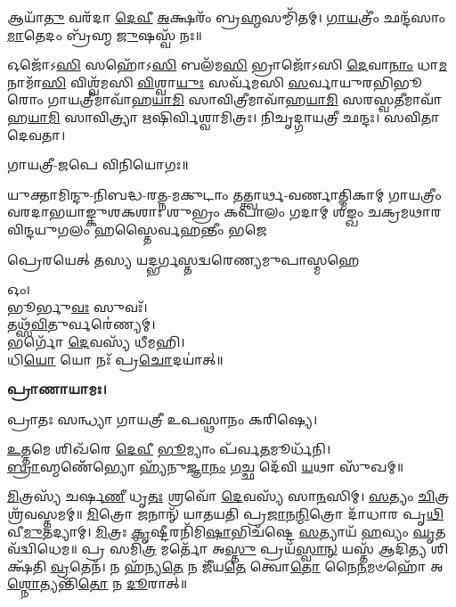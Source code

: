 𑌆𑌯𑌾᳴\-\ul{𑌤𑍁} 𑌵𑌰᳴𑌦𑌾 \ul{𑌦𑍇}\-\-\ul{𑌵𑍀} \ul{𑌅}\-𑌕𑍍𑌷𑌰𑌂᳴ 𑌬𑍍𑌰\-\ul{𑌹𑍍𑌮}\-𑌸𑌮𑍍𑌮𑌿᳴𑌤𑌮𑍍। \ul{𑌗𑌾}\-\-\ul{𑌯}\-𑌤𑍍𑌰𑍀𑌂॑ 𑌛𑌨𑍍𑌦᳴𑌸𑌾𑌂 \ul{𑌮𑌾}\-𑌤𑍇𑌦𑌂 𑌬𑍍𑌰᳴𑌹𑍍𑌮 \ul{𑌜𑍁}\-𑌷𑌸𑍍𑌵᳴ 𑌨𑌃॥

𑌓𑌜𑍋᳴𑌽\-\ul{𑌸𑌿} 𑌸𑌹𑍋᳴𑌽\-\ul{𑌸𑌿} 𑌬𑌲᳴𑌮\-\ul{𑌸𑌿} 𑌭𑍍𑌰𑌾𑌜𑍋᳴𑌽𑌸𑌿 \ul{𑌦𑍇}\-𑌵𑌾\-\ul{𑌨𑌾𑌂} 𑌧𑌾\-\ul{𑌮} 𑌨𑌾𑌮𑌾᳴\-\ul{𑌸𑌿} 𑌵𑌿𑌶𑍍𑌵᳴𑌮𑌸𑌿 \ul{𑌵𑌿}\-𑌶𑍍𑌵𑌾\-\ul{𑌯𑍁𑌃} 𑌸𑌰𑍍𑌵᳴𑌮𑌸𑌿 \ul{𑌸}\-𑌰𑍍𑌵𑌾𑌯𑍁𑌰𑌭𑌿𑌭𑍂𑌰𑍋𑌂 𑌗𑌾𑌯𑌤𑍍𑌰𑍀𑌮𑌾𑌵𑌾᳴𑌹\-\ul{𑌯𑌾}\-\-\ul{𑌮𑌿} 𑌸𑌾𑌵𑌿𑌤𑍍𑌰𑍀𑌮𑌾𑌵𑌾᳴𑌹\-\ul{𑌯𑌾}\-\-\ul{𑌮𑌿} 𑌸𑌰𑌸𑍍𑌵𑌤𑍀𑌮𑌾𑌵𑌾᳴𑌹\-\-\ul{𑌯𑌾}\-\-\ul{𑌮𑌿} 𑌸𑌾𑌵𑌿𑌤𑍍𑌰𑍍𑌯𑌾 𑌋𑌷𑌿𑌰𑍍𑌵𑌿𑌶𑍍𑌵𑌾𑌮𑌿𑌤𑍍𑌰𑌃। 𑌨𑌿𑌚𑍃𑌦𑍍𑌗𑌾𑌯𑌤𑍍𑌰𑍀 𑌛𑌨𑍍𑌦𑌃। 𑌸𑌵𑌿𑌤𑌾 𑌦𑍇𑌵𑌤𑌾।

𑌗𑌾𑌯𑌤𑍍𑌰𑍀-𑌜𑌪𑍇 𑌵𑌿𑌨𑌿𑌯𑍋𑌗𑌃॥



{𑌯𑍁𑌕𑍍𑌤𑌾𑌮𑌿𑌨𑍍𑌦𑍁-𑌨𑌿𑌬𑌦𑍍𑌧-𑌰𑌤𑍍𑌨-𑌮𑌕𑍁𑌟𑌾𑌂 𑌤𑌤𑍍𑌤𑍍𑌵𑌾𑌰𑍍𑌥-𑌵𑌰𑍍𑌣𑌾𑌤𑍍𑌮𑌿𑌕𑌾𑌮𑍍}
{𑌗𑌾𑌯𑌤𑍍𑌰𑍀𑌂 𑌵𑌰𑌦𑌾𑌭𑌯𑌾𑌙𑍍𑌕𑍁𑌶𑌕𑌶𑌾𑌃 𑌶𑍁𑌭𑍍𑌰𑌂 𑌕𑌪𑌾𑌲𑌂 𑌗𑌦𑌾𑌮𑍍}
{𑌶𑌙𑍍𑌖𑌂 𑌚𑌕𑍍𑌰𑌮𑌥𑌾𑌰𑌵𑌿𑌨𑍍𑌦𑌯𑍁𑌗𑌲𑌂 𑌹𑌸𑍍𑌤𑍈𑌰𑍍𑌵𑌹𑌨𑍍𑌤𑍀𑌂 𑌭𑌜𑍇}

{𑌪𑍍𑌰𑍇𑌰𑌯𑍇𑌤𑍍 𑌤𑌸𑍍𑌯 𑌯𑌦𑍍𑌭𑌰𑍍𑌗𑌸𑍍𑌤𑌦𑍍𑌵𑌰𑍇𑌣𑍍𑌯𑌮𑍁𑌪𑌾𑌸𑍍𑌮𑌹𑍇}


𑌓𑌂।\\
𑌭𑍂𑌰𑍍𑌭𑍁\-\ul{𑌵𑌃} 𑌸𑍁𑌵𑌃᳴।\\
𑌤𑌥𑍍𑌸᳴\-\ul{𑌵𑌿}\-𑌤𑍁𑌰𑍍𑌵𑌰𑍇॑𑌣𑍍𑌯𑌮𑍍।\\
𑌭𑌰𑍍𑌗𑍋᳴ \ul{𑌦𑍇}\-𑌵𑌸𑍍𑌯᳴ 𑌧𑍀𑌮𑌹𑌿।\\
𑌧𑌿\-\ul{𑌯𑍋} 𑌯𑍋 𑌨𑌃᳴ 𑌪𑍍𑌰\-\ul{𑌚𑍋}\-𑌦𑌯𑌾॑𑌤𑍍॥

\textbf{𑌪𑍍𑌰𑌾𑌣𑌾𑌯𑌾𑌮𑌃।}


𑌪𑍍𑌰𑌾𑌤𑌃 𑌸𑌨𑍍𑌧𑍍𑌯𑌾 𑌗𑌾𑌯𑌤𑍍𑌰𑍀 𑌉𑌪𑌸𑍍𑌥𑌾𑌨𑌂 𑌕𑌰𑌿𑌷𑍍𑌯𑍇।

\-\ul{𑌉}\-𑌤𑍍𑌤𑌮𑍇 𑌶𑌿𑌖᳴𑌰𑍇 \ul{𑌦𑍇}\-\-\ul{𑌵𑍀} \ul{𑌭𑍂}\-𑌮𑍍𑌯𑌾𑌂 𑌪᳴𑌰𑍍𑌵\-\ul{𑌤}\-𑌮𑍂𑌰𑍍𑌧᳴𑌨𑌿।\\
\-\ul{𑌬𑍍𑌰𑌾}\-𑌹𑍍𑌮𑌣𑍇᳴᳴𑌭𑍍𑌯𑍋 𑌹𑍍𑌯᳴𑌨𑍁\-\ul{𑌜𑍍𑌞𑌾}\-\-\ul{𑌨𑌂} \ul{𑌗}\-𑌚𑍍𑌛 𑌦𑍇᳴𑌵𑌿 \ul{𑌯}\-𑌥𑌾 𑌸𑍁᳴𑌖𑌮𑍍॥


\-\ul{𑌮𑌿}\-𑌤𑍍𑌰𑌸𑍍𑌯᳴ 𑌚𑌰𑍍\mbox{}𑌷\-\ul{𑌣𑍀} 𑌧𑍃\-\ul{𑌤𑌃} 𑌶𑍍𑌰𑌵𑍋᳴ \ul{𑌦𑍇}\-𑌵𑌸𑍍𑌯᳴ 𑌸𑌾\-\ul{𑌨}\-𑌸𑌿𑌮𑍍। \ul{𑌸}\-𑌤𑍍𑌯𑌂 \ul{𑌚𑌿}\-𑌤𑍍𑌰𑌶𑍍𑌰᳴𑌵𑌸𑍍𑌤𑌮𑌮𑍍॥ \ul{𑌮𑌿}\-𑌤𑍍𑌰𑍋 𑌜𑌨𑌾𑌨𑍍᳴ 𑌯𑌾𑌤𑌯𑌤𑌿 𑌪𑍍𑌰\-\ul{𑌜𑌾}\-𑌨\-\ul{𑌨𑍍𑌮𑌿}\-𑌤𑍍𑌰𑍋 𑌦𑌾᳴𑌧𑌾𑌰 𑌪𑍃\-\ul{𑌥𑌿}\-𑌵𑍀\-\ul{𑌮𑍁}\-𑌤𑌦𑍍𑌯𑌾𑌮𑍍। \ul{𑌮𑌿}\-𑌤𑍍𑌰𑌃 \ul{𑌕𑍃}\-𑌷𑍍𑌟𑍀𑌰𑌨𑌿᳴𑌮𑌿\-\ul{𑌷𑌾}\-𑌭𑌿𑌚᳴𑌷𑍍𑌟𑍇 \ul{𑌸}\-𑌤𑍍𑌯𑌾𑌯᳴ \ul{𑌹}\-𑌵𑍍𑌯𑌂 \ul{𑌘𑍃}\-𑌤𑌵᳴𑌦𑍍𑌵𑌿𑌧𑍇𑌮॥ 𑌪𑍍𑌰 𑌸𑌮𑌿᳴\-\ul{𑌤𑍍𑌰} 𑌮𑌰𑍍𑌤𑍋᳴ 𑌅\-\ul{𑌸𑍍𑌤𑍁} 𑌪𑍍𑌰𑌯᳴\-\ul{𑌸𑍍𑌵𑌾}\-\-\ul{𑌨𑍍} 𑌯𑌸𑍍𑌤᳴ 𑌆𑌦𑌿\-\ul{𑌤𑍍𑌯} 𑌶𑌿𑌕𑍍𑌷᳴𑌤𑌿 \ul{𑌵𑍍𑌰}\-𑌤𑍇𑌨᳴। 𑌨 𑌹᳴𑌨𑍍𑌯\-\ul{𑌤𑍇} 𑌨 𑌜𑍀᳴𑌯\-\ul{𑌤𑍇} 𑌤𑍍𑌵𑍋\-\ul{𑌤𑍋} 𑌨𑍈\-\ul{𑌨}\-𑌮𑍞𑌹𑍋᳴ 𑌅\-\ul{𑌶𑍍𑌨𑍋}\-𑌤𑍍𑌯𑌨𑍍𑌤𑌿᳴\-\ul{𑌤𑍋} 𑌨 \ul{𑌦𑍂}\-𑌰𑌾𑌤𑍍॥


